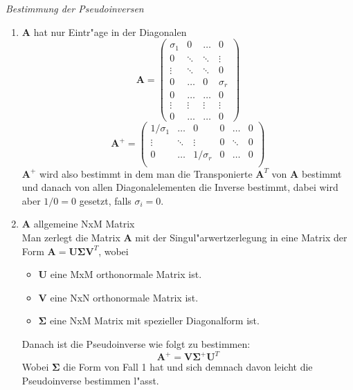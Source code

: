\documentclass[german, 10pt, a4paper, twocolumn]{scrartcl}
\begin{document}
\textit{Bestimmung der Pseudoinversen}\\
\begin{enumerate}
 \item $\mathbf{A}$ hat nur Eintr"age in der Diagonalen\\
  \begin{displaymath}
   \mathbf{A}=\left (
   \begin{array}{cccc}
    \sigma_1 &	0 &		\hdots &	0 \\
    0 &		\ddots&		\ddots &	\vdots\\
    \vdots &	\ddots &	\ddots &	0\\
    0 &		\hdots &	0 &		\sigma_r\\
    0 &		\hdots &	\hdots &	0\\
    \vdots &	\vdots &	\vdots &	\vdots\\
    0 &		\hdots &	\hdots &	0
   \end{array}
  \right )
  \end{displaymath}
  \begin{displaymath}
  \mathbf{A}^{+}=\left (
   \begin{array}{cccccc}
    1/\sigma_1 &	\hdots &	0 &		0 &	\hdots &	0\\
    \vdots &	\ddots &	\vdots &	0 &	\ddots &		0\\
    0 &		\hdots &	1/\sigma_r &	0 &	\hdots &	0\\
   \end{array}
  \right )
  \end{displaymath}
  $\mathbf{A}^+$ wird also bestimmt in dem man die Transponierte $\mathbf{A}^T$ von $\mathbf{A}$ bestimmt und danach von allen Diagonalelementen die Inverse bestimmt, dabei wird aber $1/0=0$ gesetzt, falls $\sigma_i=0$.
 \item $\mathbf{A}$ allgemeine NxM Matrix\\
  Man zerlegt die Matrix $\mathbf{A}$ mit der Singul"arwertzerlegung in eine Matrix der Form $\mathbf{A}=\mathbf{U}\mathbf{\Sigma}\mathbf{V}^T$, wobei
  \begin{itemize}
  	\item $\mathbf{U}$ eine MxM orthonormale Matrix ist. 
  	\item $\mathbf{V}$ eine NxN orthonormale Matrix ist. 
  	\item $\mathbf{\Sigma}$ eine NxM Matrix mit spezieller Diagonalform ist. 
  \end{itemize}
  Danach ist die Pseudoinverse wie folgt zu bestimmen:\\
  \begin{displaymath}
  	\mathbf{A}^+ = \mathbf{V}\mathbf{\Sigma}^+\mathbf{U}^T
  \end{displaymath}
  Wobei $\mathbf{\Sigma}$ die Form von Fall 1 hat und sich demnach davon leicht die Pseudoinverse bestimmen l"asst.
\end{enumerate}
\end{document}
